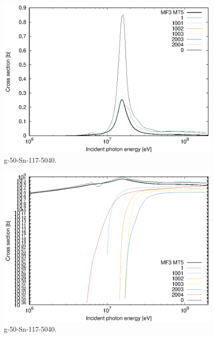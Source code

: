 \begin{figure}
 \includegraphics[width=\linewidth]{eps/g_50-Sn-117_5040.eps}
  \caption{g-50-Sn-117-5040.}
\end{figure}
\begin{figure}
 \includegraphics[width=\linewidth]{eps-log/g_50-Sn-117_5040.eps}
 \caption{g-50-Sn-117-5040.}
\end{figure}
\newpage \clearpage

